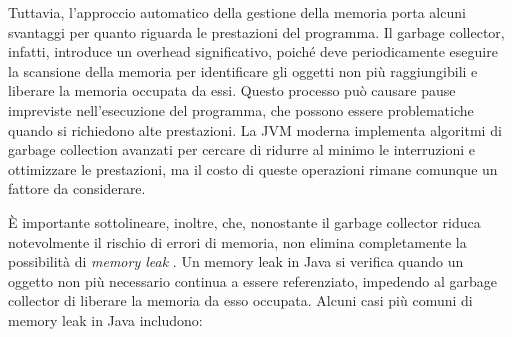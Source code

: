 Tuttavia, l'approccio automatico della gestione della memoria porta alcuni svantaggi per quanto riguarda le prestazioni del programma. Il garbage collector, infatti, introduce un overhead significativo, poiché deve periodicamente eseguire la scansione della memoria per identificare gli oggetti non più raggiungibili e liberare la memoria occupata da essi. Questo processo può causare pause impreviste nell'esecuzione del programma, che possono essere problematiche quando si richiedono alte prestazioni. La JVM moderna implementa algoritmi di garbage collection avanzati \cite{dynatrace-gc-pause} per cercare di ridurre al minimo le interruzioni e ottimizzare le prestazioni, ma il costo di queste operazioni rimane comunque un fattore da considerare. 

È importante sottolineare, inoltre, che, nonostante il garbage collector riduca notevolmente il rischio di errori di memoria, non elimina completamente la possibilità di \textit{memory leak} \cite{baeldung-java-memory-leaks}. Un memory leak in Java si verifica quando un oggetto non più necessario continua a essere referenziato, impedendo al garbage collector di liberare la memoria da esso occupata. Alcuni casi più comuni di memory leak in Java includono:
